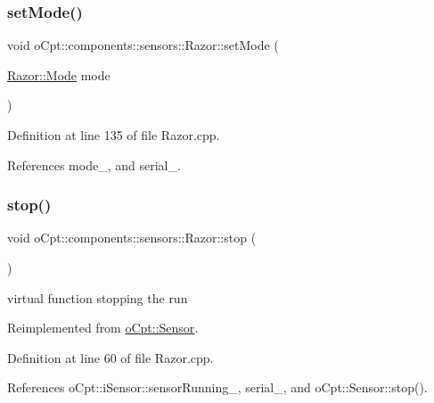 \subsubsection{\texorpdfstring{set\+Mode()}{setMode()}}
{\footnotesize\ttfamily void o\+Cpt\+::components\+::sensors\+::\+Razor\+::set\+Mode (\begin{DoxyParamCaption}\item[{\hyperlink{classo_cpt_1_1components_1_1sensors_1_1_razor_afed258e485aaaf9193a57d649ccb159b}{Razor\+::\+Mode}}]{mode }\end{DoxyParamCaption})}



Definition at line 135 of file Razor.\+cpp.



References mode\+\_\+, and serial\+\_\+.

\hypertarget{classo_cpt_1_1components_1_1sensors_1_1_razor_a807441c137892ee3c1b612c284893fa1}{}\label{classo_cpt_1_1components_1_1sensors_1_1_razor_a807441c137892ee3c1b612c284893fa1} 
\subsubsection{\texorpdfstring{stop()}{stop()}}
{\footnotesize\ttfamily void o\+Cpt\+::components\+::sensors\+::\+Razor\+::stop (\begin{DoxyParamCaption}{ }\end{DoxyParamCaption})\hspace{0.3cm}{\ttfamily [virtual]}}

virtual function stopping the run 

Reimplemented from \hyperlink{classo_cpt_1_1_sensor_a44ad78c2c091ca9cf72295293f8c5b74}{o\+Cpt\+::\+Sensor}.



Definition at line 60 of file Razor.\+cpp.



References o\+Cpt\+::i\+Sensor\+::sensor\+Running\+\_\+, serial\+\_\+, and o\+Cpt\+::\+Sensor\+::stop().

